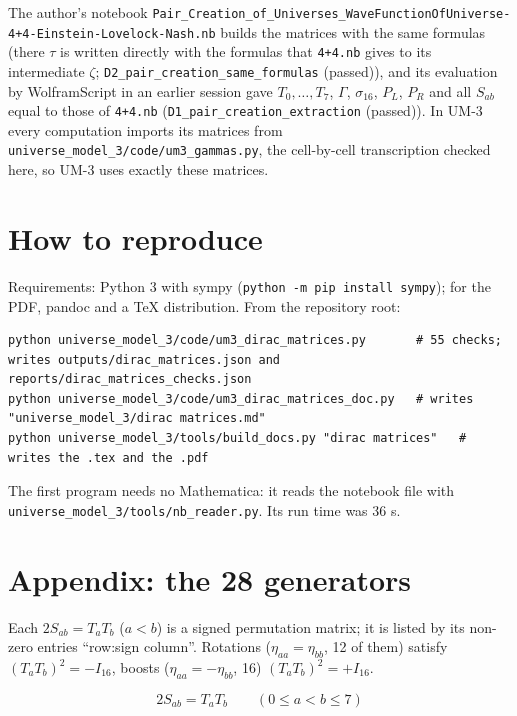 \documentclass[
  10pt,
]{article}
\begin{document}
The author's notebook
\texttt{Pair\_Creation\_of\_Universes\_WaveFunctionOfUniverse-4+4-Einstein-Lovelock-Nash.nb}
builds the matrices with the same formulas (there \(\tau\) is written
directly with the formulas that \texttt{4+4.nb} gives to its
intermediate \(\zeta\); \texttt{D2\_pair\_creation\_same\_formulas}
(passed)), and its evaluation by WolframScript in an earlier session
gave \(T_0, \dots, T_7\), \(\Gamma\), \(\sigma_{16}\), \(P_L\), \(P_R\)
and all \(S_{ab}\) equal to those of \texttt{4+4.nb}
(\texttt{D1\_pair\_creation\_extraction} (passed)). In UM-3 every
computation imports its matrices from
\texttt{universe\_model\_3/code/um3\_gammas.py}, the cell-by-cell
transcription checked here, so UM-3 uses exactly these matrices.

\hypertarget{how-to-reproduce}{%
\section{How to reproduce}\label{how-to-reproduce}}

Requirements: Python 3 with sympy
(\texttt{python\ -m\ pip\ install\ sympy}); for the PDF, pandoc and a
TeX distribution. From the repository root:

\begin{verbatim}
python universe_model_3/code/um3_dirac_matrices.py       # 55 checks; writes outputs/dirac_matrices.json and reports/dirac_matrices_checks.json
python universe_model_3/code/um3_dirac_matrices_doc.py   # writes "universe_model_3/dirac matrices.md"
python universe_model_3/tools/build_docs.py "dirac matrices"   # writes the .tex and the .pdf
\end{verbatim}

The first program needs no Mathematica: it reads the notebook file with
\texttt{universe\_model\_3/tools/nb\_reader.py}. Its run time was 36 s.

\hypertarget{appendix-the-28-generators}{%
\section{Appendix: the 28 generators}\label{appendix-the-28-generators}}

Each \(2S_{ab} = T_aT_b\) (\(a < b\)) is a signed permutation matrix; it
is listed by its non-zero entries ``row:sign column''. Rotations
(\(\eta_{aa} = \eta_{bb}\), 12 of them) satisfy
\((T_aT_b)^2 = -I_{16}\), boosts (\(\eta_{aa} = -\eta_{bb}\), 16)
\((T_aT_b)^2 = +I_{16}\).

\[
2S_{ab} = T_aT_b\qquad (0 \le a < b \le 7)
\]
\end{document}
